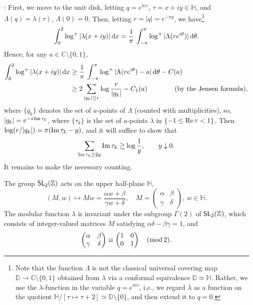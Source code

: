 \documentclass[12pt]{paper}
\newcommand{\bC}{\mathbb C}
\newcommand{\bZ}{\mathbb Z}
\newcommand{\bD}{\mathbb D}
\newcommand{\bH}{\mathbb H}
\newcommand{\im}{{\rm Im}\,}
\newcommand{\re}{{\rm Re}\,}
\begin{document}
\smallskip{}:
First, we move to the unit disk, letting $q=e^{\pi i\tau}$, $\tau = x + iy\in\bH$,  
and $\Lambda (q) = \lambda (\tau)$,
$\Lambda (0) = 0$. Then, letting $r=|q|=e^{-\pi y}$, we have\footnote
{Note that the function $\Lambda$ is not the classical universal covering
map $\bD \to \bC\setminus\{0, 1\}$ obtained from $\lambda$ via a conformal
equivalence $\bD \simeq \bH$. Rather, we use the $\lambda$-function in the variable
$q=e^{\pi i \tau}$, i.e.,  we regard $\lambda$ as a function on the quotient 
$\bH/[\tau\mapsto \tau+2] \simeq \bD\setminus\{0\}$, and then extend it to $q=0$. 
}
\[
\int_0^2 \log^+ |\lambda (x+iy)|\, {\rm d}x 
= \frac1\pi\, \int_{-\pi}^\pi \log^+|\Lambda(re^{i\theta})|\, 
{\rm d}\theta.
\]
Hence, for any $a\in \bC\setminus\{0, 1\}$,
\begin{align*}
\int_0^2 \log^+ |\lambda (x+iy)|\, {\rm d}x  &\ge
\frac1\pi\, \int_{-\pi}^\pi \log^+ |\Lambda(re^{i\theta}) - a|\, 
{\rm d}\theta - C(a) \\
&\ge 2\sum_{|q_k|\le r} \log\frac{r}{|q_k|} - C_1(a) 
\qquad \qquad ({\rm by\ the\ Jensen\ formula}),
\end{align*}
where $\{q_k\}$ denotes
the set of $a$-points of $\Lambda$ (counted with multiplicities), so, $|q_k|=e^{-\pi {\rm Im\,}\tau_k}$, where 
$\{\tau_k\}$ is the set of $a$-points $\lambda$ in $\{-1\le \re \tau <1\}$. Then
$\log (r/|q_k|) = \pi (\im \tau_k - y)$, and it will suffice to show that
\begin{equation}\label{eq:*}
\sum_{\im \tau_k \ge 2y} \im \tau_k  \gtrsim \log\frac1y, \qquad y\downarrow 0.
\end{equation}
It remains to make the necessary counting.

The group ${\sf SL}_2(\bZ)$ acts on the upper half-plane $\bH$,
\[
(M, w) \mapsto Mw = \frac{\alpha w + \beta}{\gamma w + \delta}, 
\quad M = \left( \begin{matrix}
\alpha & \beta \\
\gamma & \delta
\end{matrix} \right), \ w\in\bH.
\]
The modular function $\lambda$ is invariant under the subgroup $\Gamma (2)$ of ${\sf SL}_2(\bZ)$,
which consists of integer-valued matrices $M$ satisfying $\alpha \delta - \beta\gamma =1$, and
\[
\left( \begin{matrix}
\alpha & \beta \\
\gamma & \delta
\end{matrix} \right)
\equiv
\left(
\begin{matrix}
1 & 0 \\
0 & 1
\end{matrix}
\right)
\quad ({\rm mod\,} 2).
\]
\end{document}
